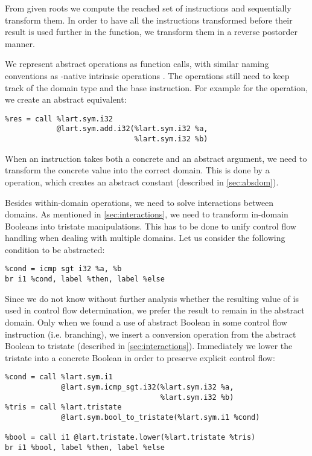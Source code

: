 From given roots we compute the reached set of instructions and sequentially
transform them. In order to have all the instructions transformed before their
result is used further in the function, we transform them in a reverse postorder manner.

We represent abstract operations as function calls, with similar naming
conventions as \LLVM-native intrinsic operations \cite{LLVM:langref}. The
operations still need to keep track of the domain type and the base \LLVM instruction.
For example for the  operation, we create an abstract equivalent:
\begin{verbatim}
%res = call %lart.sym.i32
            @lart.sym.add.i32(%lart.sym.i32 %a,
                              %lart.sym.i32 %b)
\end{verbatim}

When an instruction takes both a concrete and an abstract argument, we need to
transform the concrete value into the correct domain. This is done by a 
operation, which creates an abstract constant (described in
\autoref{sec:absdom}).

Besides within-domain operations, we need to solve interactions between domains.
As mentioned in \autoref{sec:interactions}, we need to transform in-domain
Booleans into tristate manipulations. This has to be done to unify control flow
handling when dealing with multiple domains. Let us consider the following
condition to be abstracted:
\begin{verbatim}
%cond = icmp sgt i32 %a, %b
br i1 %cond, label %then, label %else
\end{verbatim}
Since we do not know without further analysis whether the resulting value of
 is used in control flow determination, we prefer the result to
remain in the abstract domain. Only when we found a use of abstract Boolean in
some control flow instruction (i.e. branching), we insert a conversion operation
from the abstract Boolean to tristate (described in \autoref{sec:interactions}).
Immediately we lower the tristate into a concrete Boolean in order to preserve
explicit control flow:
\begin{verbatim}
%cond = call %lart.sym.i1
             @lart.sym.icmp_sgt.i32(%lart.sym.i32 %a,
                                    %lart.sym.i32 %b)
%tris = call %lart.tristate
             @lart.sym.bool_to_tristate(%lart.sym.i1 %cond)

%bool = call i1 @lart.tristate.lower(%lart.tristate %tris)
br i1 %bool, label %then, label %else
\end{verbatim}

